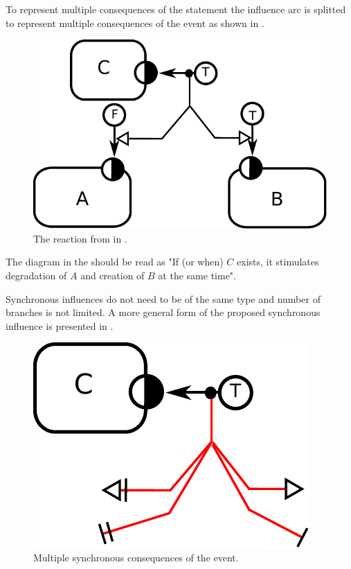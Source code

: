 To represent multiple consequences of the statement the influence arc is splitted to represent multiple consequences of the event as shown in . 

\begin{figure}[H]
  \centering
  \includegraphics[scale = 0.75]{images/synchronous}
  \caption{The reaction from  in \ER.}
  \label{fig:synchronous}
\end{figure}

The diagram in the  should be read as "If (or when) $C$ exists, it stimulates degradation of $A$ and creation of $B$ at the same time". 

Synchronous influences do not need to be of the same type and number of branches is not limited. A more general form of the proposed synchronous influence is presented in .

\begin{figure}[H]
  \centering
  \includegraphics[scale = 0.75]{images/simultaneous}
  \caption{Multiple synchronous consequences of the event.}
  \label{fig:simultaneous}
\end{figure}


